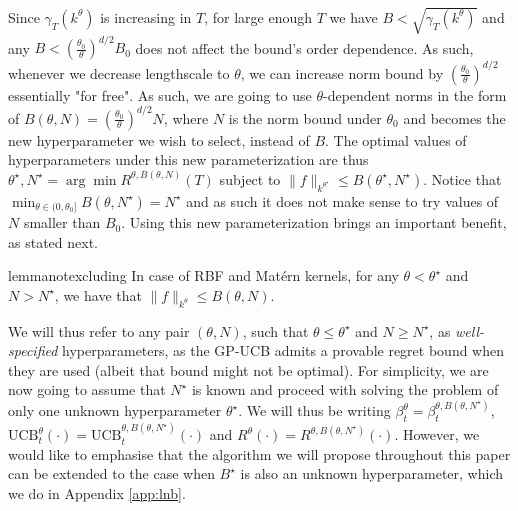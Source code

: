 \documentclass{article}
\theoremstyle{plain}
\theoremstyle{definition}
\theoremstyle{remark}
\theoremstyle{plain}
\begin{document}
Since $\gamma_T(k^{\theta})$ is increasing in $T$, for   large enough $T$ we have $B < \sqrt{\gamma_T(k^\theta)}$ and any $B < \left(\frac{\theta_0}{\theta} \right)^{d/2}B_0$ does not affect the bound's order dependence. As such, whenever we decrease lengthscale to $\theta$, we can increase norm bound by $\left(\frac{\theta_0}{\theta} \right)^{d/2}$ essentially "for free". As such, we are going to use $\theta$-dependent norms in the form of $B(\theta, N) = (\frac{\theta_0}{\theta})^{d/2} N$, where $N$ is the norm bound under $\theta_0$ and becomes the new hyperparameter we wish to select, instead of $B$. The optimal values of hyperparameters under this new parameterization are thus $\theta^\star, N^\star = \arg\min R^{\theta, B(\theta, N)}(T)$ subject to $\lVert f \rVert_{k^{\theta^\star}} \le B(\theta^\star, N^\star)$. Notice that $\min_{\theta \in (0, \theta_0]} B(\theta, N^\star) = N^\star $ and as such it does not make sense to try values of $N$ smaller than $B_0$. Using this new parameterization brings an important benefit, as stated next.

\begin{restatable}{lemma}{notexcluding}
\label{lemma:notexcluding} In case of RBF and Matérn kernels, for any $\theta < \theta^\star$ and $N > N^\star$, we have that $ \lVert f \rVert_{k^{\theta}} \le B(\theta,N)$.
\end{restatable}

We will thus refer to any pair $(\theta, N)$, such that $\theta \le \theta^\star$ and $N \ge N^\star$, as \textit{well-specified} hyperparameters, as the GP-UCB admits a provable regret bound when they are used (albeit that bound might not be optimal). For simplicity, we are now going to assume that $N^\star$ is known and proceed with solving the problem of only one unknown hyperparameter $\theta^\star$. We will thus be writing $\beta^\theta_t = \beta^{\theta, B(\theta, N^\star)}_t$, $\textrm{UCB}_t^\theta(\cdot) = \textrm{UCB}_t^{\theta, B(\theta, N^\star)}(\cdot)$  and $R^\theta(\cdot) = R^{\theta, B(\theta,N^\star)}(\cdot)$. However, we would like to emphasise that the algorithm we will propose throughout this paper can be extended to the case when $B^{\star}$ is also an unknown hyperparameter, which we do in Appendix \ref{app:lnb}.  
\end{document}
